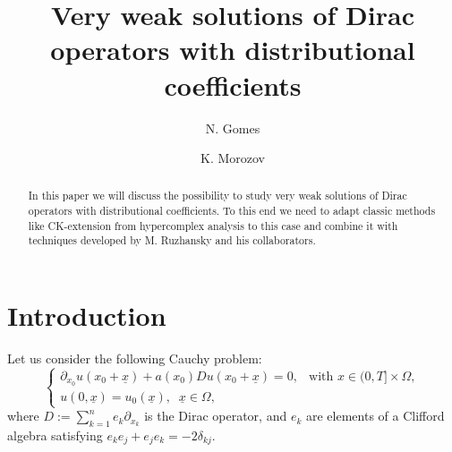 \documentclass[12pt]{amsart}
\theoremstyle{definition}
\newcommand{\un}{\underline}
\begin{document}
\title[Dirac operators with distributional coefficients]{Very weak solutions of Dirac operators with distributional coefficients }


\author[N. Gomes]{N. Gomes}
\address{(NG) CIDMA - Center for Research and Development in Mathematics and Applications, \newline Universidade de Cabo Verde \newline Campus 
  \newline Praia, Cabo Verde}
\email{}

\author[K. Morozov]{K. Morozov}
\address{(KM) CIDMA - Center for Research and Development in Mathematics and Applications, \newline Department of Mathematics, University of Aveiro \newline Campus Universit\'ario de Santiago
  -193 Aveiro, Portugal}
\email{}

%
%
%





\begin{abstract}
In this paper we will discuss the possibility to study very weak solutions of Dirac operators with distributional coefficients. To this end we need to adapt classic methods like CK-extension from hypercomplex analysis to this case and combine it with techniques developed by M. Ruzhansky and his collaborators. 
\end{abstract}

\maketitle



\section{Introduction}



Let us  consider the following Cauchy problem:
\begin{equation}
  \begin{cases}
\partial_{x_0} u(x_0+\un{x}) + a(x_0)D u(x_0+\un{x}) = 0, & \text{with } x \in (0, T]\times\Omega, \\
u(0,\un{x}) = u_0(\un{x}),\;\; \un{x}\in \Omega,
\end{cases}
\label{CP}  
\end{equation}
where $D := \sum_{k=1}^n e_k \partial_{x_k}$ is the Dirac operator, and $e_k$ are elements of a Clifford algebra satisfying $e_k e_j + e_j e_k = -2\delta_{kj}$.
\end{document}
